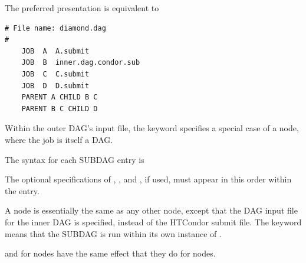 The preferred presentation is equivalent to
\begin{verbatim}
# File name: diamond.dag
#
    JOB  A  A.submit 
    JOB  B  inner.dag.condor.sub
    JOB  C  C.submit	
    JOB  D  D.submit
    PARENT A CHILD B C
    PARENT B C CHILD D
\end{verbatim}

Within the outer DAG's input file,
the  keyword specifies a special case of a 
node, where the job is itself a DAG.

The syntax for each SUBDAG entry is

   
  

The optional specifications of , , and ,
if used, must appear in this order within the entry.

A  node is essentially the same as any other node,
except that the DAG input file for the inner DAG is specified,
instead of the HTCondor submit file.
The keyword  means that the
SUBDAG is run within its own instance of .

 and  for  nodes have the same effect
that they do for  nodes.

